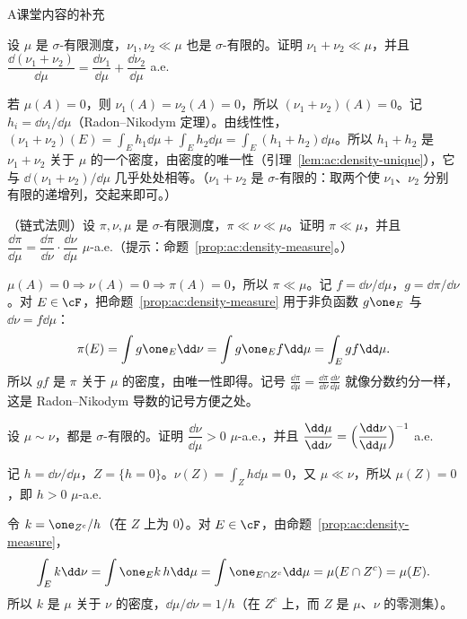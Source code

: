 \begin{exercises}{A}{课堂内容的补充}
\item\label{ex:ac:A1} 设 $\mu$ 是 $\sigma$-有限测度，$\nu_1,\nu_2\ll\mu$ 也是 $\sigma$-有限的。证明 $\nu_1+\nu_2\ll\mu$，并且 $\dfrac{\dd(\nu_1+\nu_2)}{\dd\mu}=\dfrac{\dd\nu_1}{\dd\mu}+\dfrac{\dd\nu_2}{\dd\mu}$ a.e.
\begin{solution}
若 $\mu(A)=0$，则 $\nu_1(A)=\nu_2(A)=0$，所以 $(\nu_1+\nu_2)(A)=0$。记 $h_i=\dd\nu_i/\dd\mu$（Radon--Nikodym 定理）。由线性性，$(\nu_1+\nu_2)(E)=\int_Eh_1\dd\mu+\int_Eh_2\dd\mu=\int_E(h_1+h_2)\dd\mu$。所以 $h_1+h_2$ 是 $\nu_1+\nu_2$ 关于 $\mu$ 的一个密度，由密度的唯一性（引理~\ref{lem:ac:density-unique}），它与 $\dd(\nu_1+\nu_2)/\dd\mu$ 几乎处处相等。（$\nu_1+\nu_2$ 是 $\sigma$-有限的：取两个使 $\nu_1$、$\nu_2$ 分别有限的递增列，交起来即可。）
\end{solution}

\item\label{ex:ac:A2} （链式法则）设 $\pi,\nu,\mu$ 是 $\sigma$-有限测度，$\pi\ll\nu\ll\mu$。证明 $\pi\ll\mu$，并且 $\dfrac{\dd\pi}{\dd\mu}=\dfrac{\dd\pi}{\dd\nu}\cdot\dfrac{\dd\nu}{\dd\mu}$ $\mu$-a.e.（提示：命题~\ref{prop:ac:density-measure}。）
\begin{solution}
$\mu(A)=0\Rightarrow\nu(A)=0\Rightarrow\pi(A)=0$，所以 $\pi\ll\mu$。记 $f=\dd\nu/\dd\mu$，$g=\dd\pi/\dd\nu$。对 $E\in\cF$，把命题~\ref{prop:ac:density-measure} 用于非负函数 $g\one_E$ 与 $\dd\nu=f\dd\mu$：
\[
\pi(E)=\int g\one_E\dd\nu=\int g\one_Ef\dd\mu=\int_Egf\dd\mu .
\]
所以 $gf$ 是 $\pi$ 关于 $\mu$ 的密度，由唯一性即得。记号 $\frac{\dd\pi}{\dd\mu}=\frac{\dd\pi}{\dd\nu}\frac{\dd\nu}{\dd\mu}$ 就像分数约分一样，这是 Radon--Nikodym 导数的记号方便之处。
\end{solution}

\item\label{ex:ac:A3} 设 $\mu\sim\nu$，都是 $\sigma$-有限的。证明 $\dfrac{\dd\nu}{\dd\mu}>0$ $\mu$-a.e.，并且 $\dfrac{\dd\mu}{\dd\nu}=\Bigl(\dfrac{\dd\nu}{\dd\mu}\Bigr)^{-1}$ a.e.
\begin{solution}
记 $h=\dd\nu/\dd\mu$，$Z=\{h=0\}$。$\nu(Z)=\int_Zh\dd\mu=0$，又 $\mu\ll\nu$，所以 $\mu(Z)=0$，即 $h>0$ $\mu$-a.e.

令 $k=\one_{Z^c}/h$（在 $Z$ 上为 $0$）。对 $E\in\cF$，由命题~\ref{prop:ac:density-measure}，
\[
\int_Ek\dd\nu=\int\one_Ek\,h\dd\mu=\int\one_{E\cap Z^c}\dd\mu=\mu(E\cap Z^c)=\mu(E).
\]
所以 $k$ 是 $\mu$ 关于 $\nu$ 的密度，$\dd\mu/\dd\nu=1/h$（在 $Z^c$ 上，而 $Z$ 是 $\mu$、$\nu$ 的零测集）。
\end{solution}


\end{exercises}
